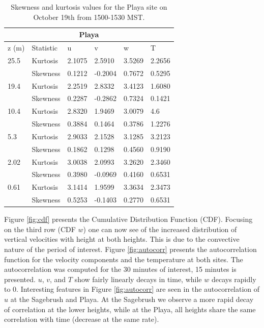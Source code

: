 \documentclass[]{article}
\begin{document}
\begin{table}
\begin{tabular}{ |p{1cm}|p{1.5cm}|p{1cm}|p{1.25cm}|p{1cm}| p{1.25cm}|}
	\hline
	\multicolumn{6}{|c|}{Playa} \\
	\hline\hline
	z (m) & Statistic & u &  v & w & T\\
	\hline
	25.5 & Kurtosis & 2.1075 & 2.5910 & 3.5269 &  2.2656\\
	&Skewness & 0.1212 & -0.2004 & 0.7672 & 0.5295\\
	\hline
	19.4 & Kurtosis & 2.2519 & 2.8332 & 3.4123 &1.6080 \\
	&Skewness & 0.2287 & -0.2862 & 0.7324 & 0.1421\\
	\hline
	10.4 & Kurtosis & 2.8320 & 1.9469 & 3.0079 &4.6 \\
	&Skewness & 0.3884 & 0.1464 & 0.3786 &1.2276\\
	\hline
	5.3 & Kurtosis & 2.9033 & 2.1528  & 3.1285 & 3.2123  \\
	&Skewness & 0.1862 & 0.1298 & 0.4560 & 0.9190\\
	\hline
	2.02 & Kurtosis &\cellcolor{red!25} 3.0038 & 2.0993 & 3.2620  & 2.3460\\
	&Skewness & \cellcolor{blue!25} 0.3980 & -0.0969 & 0.4160 & 0.6531\\
	\hline
	0.61 & Kurtosis & \cellcolor{red!25} 3.1414 & 1.9599 & 3.3634  & 2.3473\\
	&Skewness & \cellcolor{blue!25} 0.5253 & -0.1403 & 0.2770 &0.6531\\
	\hline
\end{tabular}
\label{tab:kurt_playa}
\caption{Skewness and kurtosis values for the Playa site on October 19th from 1500-1530 MST. }
\end{table}
Figure \ref{fig:cdf} presents the Cumulative Distribution Function (CDF). Focusing on the third row (CDF $w$) one can now see of the increased distribution of vertical velocities with height at both heights. This is due to the convective nature of the period of interest. Figure \ref{fig:autocorr} presents the autocorrelation function for the velocity components and the temperature at both sites. The autocorrelation was computed for the 30 minutes of interest, 15 minutes is presented. $u$, $v$, and $T$ show fairly linearly decays in time, while $w$ decays rapidly to 0. Interesting features in Figure \ref{fig:autocorr} are seen in the autocorrelation of $u$ at the Sagebrush and Playa. At the Sagebrush we observe a more rapid decay of correlation at the lower heights, while at the Playa, all heights share the same correlation with time (decrease at the same rate). 
\end{document}
